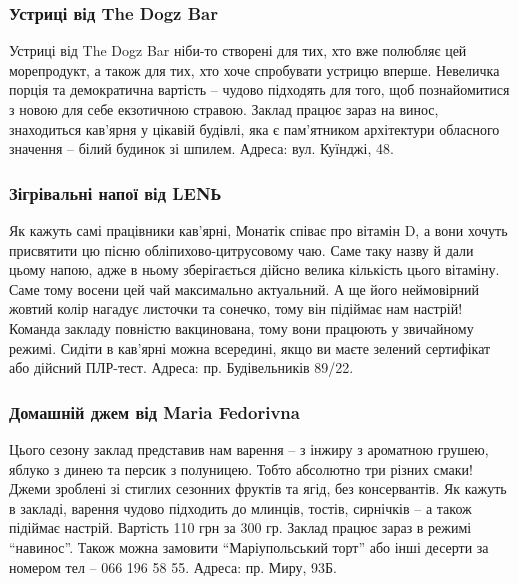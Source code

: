 \subsubsection{Устриці від The Dogz Bar}


Устриці від The Dogz Bar ніби-то створені для тих, хто вже полюбляє цей
морепродукт, а також для тих, хто хоче спробувати устрицю вперше. Невеличка
порція та демократична вартість – чудово підходять для того, щоб познайомитися
з новою для себе екзотичною стравою. Заклад працює зараз на винос, знаходиться
кав'ярня у цікавій будівлі, яка є пам'ятником архітектури обласного значення –
білий будинок зі шпилем. Адреса: вул. Куїнджі, 48.

\subsubsection{Зігрівальні напої від LENЬ}


Як кажуть самі працівники кав'ярні, Монатік співає про вітамін D, а вони хочуть
присвятити цю пісню обліпихово-цитрусовому чаю. Саме таку назву й дали цьому
напою, адже в ньому зберігається дійсно велика кількість цього вітаміну. Саме
тому восени цей чай максимально актуальний. А ще його неймовірний жовтий колір
нагадує листочки та сонечко, тому він підіймає нам настрій! Команда закладу
повністю вакцинована, тому вони працюють у звичайному режимі. Сидіти в кав'ярні
можна всередині, якщо ви маєте зелений сертифікат або дійсний ПЛР-тест. Адреса:
пр. Будівельників 89/22.

\subsubsection{Домашній джем від Maria Fedorivna}


Цього сезону заклад представив нам варення – з інжиру з ароматною грушею,
яблуко з динею та персик з полуницею. Тобто абсолютно три різних смаки! Джеми
зроблені зі стиглих сезонних фруктів та ягід, без консервантів. Як кажуть в
закладі, варення чудово підходить до млинців, тостів, сирнічків – а також
підіймає настрій. Вартість 110 грн за 300 гр. Заклад працює зараз в режимі
\enquote{навинос}. Також можна замовити \enquote{Маріупольський торт} або інші
десерти за номером тел – 066 196 58 55. Адреса: пр. Миру, 93Б.

